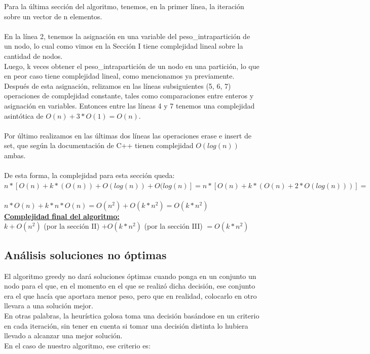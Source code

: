 Para la última sección del algoritmo, tenemos, en la primer línea, la iteración sobre un vector de n elementos.\\\\
En la línea 2, tenemos la asignación en una variable del peso\_intrapartición de un nodo, lo cual como vimos en la Sección I tiene complejidad lineal sobre la cantidad de nodos.\\
Luego, k veces obtener el peso\_intrapartición de un nodo en una partición, lo que en peor caso tiene complejidad lineal, como mencionamos ya previamente. Después de esta asignación, relizamos en las líneas subsiguientes (5, 6, 7) operaciones de complejidad constante, tales como comparaciones entre enteros y asignación en variables. Entonces entre las líneas 4 y 7 tenemos una complejidad asintótica de $O(n) + 3*O(1) = O(n)$.\\\\
Por último realizamos en las últimas dos líneas las operaciones erase e insert de set, que según la documentación de C++ tienen complejidad $O(log(n))$ ambas.\\\\
De esta forma, la complejidad para esta sección queda:\\

$n*[O(n)+k*(O(n))+O(log(n))+O(log(n)] = n*[O(n)+k*(O(n) + 2*O(log(n)))] = $ \\\\
$n*O(n) + k*n*O(n) = O(n^2) + O(k*n^2) = O(k*n^2)$\\


\newpage
\textbf{\underline{Complejidad final del algoritmo:}}\\

$k +  O(n^2)$ (por la sección II) $+ O(k*n^2)$ (por la sección III) $=  O(k*n^2)$\\

\subsection{Análisis soluciones no óptimas}

El algoritmo greedy no dará soluciones óptimas cuando ponga en un conjunto un nodo para el que, en el momento en el que se realizó dicha decisión, ese conjunto era el que hacía que aportara menor peso, pero que en realidad, colocarlo en otro llevara a una solución mejor.\\
En otras palabras, la heurística golosa toma una decisión basándose en un criterio en cada iteración, sin tener en cuenta si tomar una decisión distinta lo hubiera llevado a alcanzar una mejor solución.\\
En el caso de nuestro algoritmo, ese criterio es:\\


